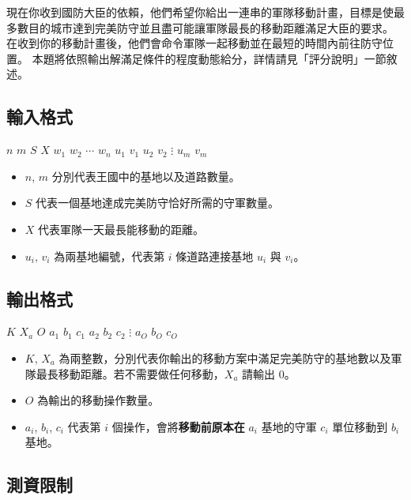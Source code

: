 現在你收到國防大臣的依賴，他們希望你給出一連串的軍隊移動計畫，目標是使最多數目的城巿達到完美防守並且盡可能讓軍隊最長的移動距離滿足大臣的要求。
在收到你的移動計畫後，他們會命令軍隊一起移動並在最短的時間內前往防守位置。
本題將依照輸出解滿足條件的程度動態給分，詳情請見「評分說明」一節敘述。

\subsection{輸入格式}

\begin{format}
\f{
$n$ $m$ $S$ $X$
$w_1$ $w_2$ $\cdots$ $w_n$
$u_1$ $v_1$
$u_2$ $v_2$
$\vdots$
$u_m$ $v_m$
}
\end{format}

\begin{itemize}
\tightlist
\item
  \(n\), \(m\) 分別代表王國中的基地以及道路數量。
\item
  \(S\) 代表一個基地達成完美防守恰好所需的守軍數量。
\item
  \(X\) 代表軍隊一天最長能移動的距離。
\item
  \(u_i\), \(v_i\) 為兩基地編號，代表第 \(i\) 條道路連接基地 \(u_i\) 與
  \(v_i\)。
\end{itemize}

\subsection{輸出格式}

\begin{format}
\f{
$K$ $X_a$ $O$
$a_1$ $b_1$ $c_1$
$a_2$ $b_2$ $c_2$
$\vdots$
$a_O$ $b_O$ $c_O$
}
\end{format}

\begin{itemize}
\tightlist
\item
  \(K\), \(X_a\)
  為兩整數，分別代表你輸出的移動方案中滿足完美防守的基地數以及軍隊最長移動距離。若不需要做任何移動，\(X_a\)
  請輸出 \(0\)。
\item
  \(O\) 為輸出的移動操作數量。
\item
  \(a_i\), \(b_i\), \(c_i\) 代表第 \(i\)
  個操作，會將\textbf{移動前原本在} \(a_i\) 基地的守軍 \(c_i\)
  單位移動到 \(b_i\) 基地。
\end{itemize}

\subsection{測資限制}

